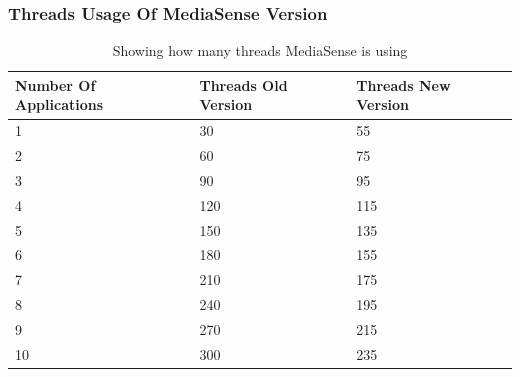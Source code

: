 \subsubsection{Threads Usage Of MediaSense Version}
\begin{table}[H]
\begin{center}
    \begin{tabular}[t!]{ | l | l | l |}
    \hline
    Number Of Applications								& Threads Old Version			& Threads New Version\\ \hline
    1 													& 30							& 55\\ \hline
    2 													& 60							& 75\\ \hline
    3 													& 90							& 95\\ \hline
    4 													& 120							& 115\\ \hline
    5 													& 150							& 135\\ \hline
    6 													& 180							& 155\\ \hline
    7 													& 210							& 175\\ \hline
    8 													& 240							& 195\\ \hline
    9 													& 270							& 215\\ \hline
    10 													& 300							& 235\\ \hline
    \end{tabular}
    \caption{Showing how many threads MediaSense is using}
\end{center}
\end{table}
\clearpage

